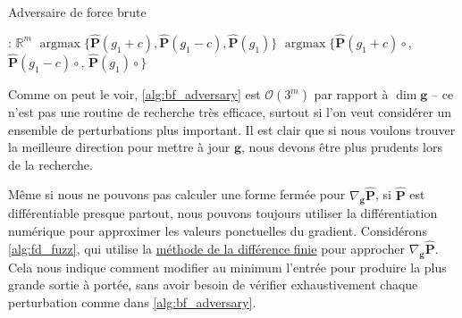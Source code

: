 \begin{algorithm}[H]
\caption{Adversaire de force brute}
\label{alg:bf_adversary}
\begin{algorithmic}[1]
: $\mathbb{R}^m$
 
\State \Return $\operatorname{argmax}\{\mathbf{\hat P}(g_1 + c), \mathbf{\hat P}(g_1 - c), \mathbf{\hat P}(g_1)\}$
\Else {}
\State \Return $\operatorname{argmax}\{\mathbf{\hat P}(g_1 + c) \circ$,\newline
\hspace*{10em} $\mathbf{\hat P}(g_1 - c)\circ$,\newline
\hspace*{10em} $\mathbf{\hat P}(g_1)\circ$$\}$
\EndIf
\EndProcedure
\end{algorithmic}
\end{algorithm}

Comme on peut le voir, \autoref{alg:bf_adversary} est $\mathcal{O}(3^m)$ par rapport à $\dim \mathbf g$ -- ce n'est pas une routine de recherche très efficace, surtout si l'on veut considérer un ensemble de perturbations plus important. Il est clair que si nous voulons trouver la meilleure direction pour mettre à jour $\mathbf g$, nous devons être plus prudents lors de la recherche.

Même si nous ne pouvons pas calculer une forme fermée pour $\nabla_{\mathbf g}\mathbf{\hat P}$, si $\mathbf{\hat P}$ est différentiable presque partout, nous pouvons toujours utiliser la différentiation numérique pour approximer les valeurs ponctuelles du gradient. Considérons \autoref{alg:fd_fuzz}, qui utilise la \hyperref[sec:fdm]{méthode de la différence finie} pour approcher $\nabla_{\mathbf g}\mathbf{\hat P}$. Cela nous indique comment modifier au minimum l'entrée pour produire la plus grande sortie à portée, sans avoir besoin de vérifier exhaustivement chaque perturbation comme dans \autoref{alg:bf_adversary}.


